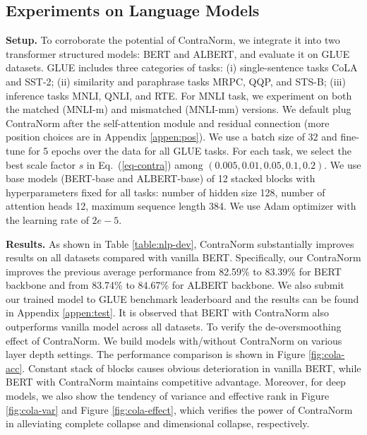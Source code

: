 \documentclass{article}
\theoremstyle{definition}
\theoremstyle{remark}
\theoremstyle{theorem}
\begin{document}
\subsection{Experiments on Language Models} \label{sec:nlp-task}
\textbf{Setup.} 
To corroborate the potential of ContraNorm, we integrate it into two transformer structured models: BERT and ALBERT, and evaluate it on GLUE datasets. GLUE includes three categories of tasks:  (i) single-sentence tasks CoLA and SST-2; (ii) similarity and paraphrase tasks MRPC, QQP, and STS-B; (iii) inference tasks MNLI, QNLI, and RTE. For MNLI task, we experiment on both the matched (MNLI-m) and mismatched (MNLI-mm) versions. We default plug ContraNorm after the self-attention module and residual connection (more position choices are in Appendix \ref{appen:pos}). We use a batch size of 32 and fine-tune for 5 epochs over the data for all GLUE tasks. For each task, we select the best scale factor $s$ in Eq.~(\ref{eq-contra}) among $(0.005, 0.01, 0.05, 0.1, 0.2)$. We use base models (BERT-base and ALBERT-base) of 12 stacked blocks with hyperparameters fixed for all tasks: number of hidden size 128, number of attention heads 12, maximum sequence length 384. We use Adam \citep{kingma2014adam} optimizer with the learning rate of $2e-5$. 

\textbf{Results.} As shown in Table \ref{table:nlp-dev}, ContraNorm substantially improves results on all datasets compared with vanilla BERT. Specifically, our ContraNorm improves the previous average performance from 82.59\% to 83.39\% for BERT backbone and from 83.74\% to 84.67\% for ALBERT backbone. We also submit our trained model to GLUE benchmark leaderboard and the results can be found in Appendix \ref{appen:test}. It is observed that BERT with ContraNorm also outperforms vanilla model across all datasets. To verify the de-oversmoothing effect of ContraNorm. We build models with/without ContraNorm on various layer depth settings. The performance comparison is shown in Figure \ref{fig:cola-acc}. Constant stack of blocks causes obvious deterioration in vanilla BERT, while BERT with ContraNorm maintains competitive advantage. Moreover, for deep models, we also show the tendency of variance and effective rank in Figure \ref{fig:cola-var} and Figure \ref{fig:cola-effect}, which verifies the power of ContraNorm in alleviating complete collapse and dimensional collapse, respectively.
\end{document}
